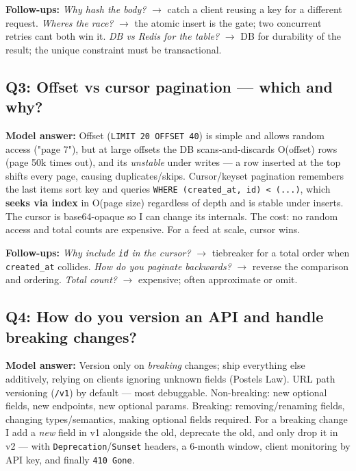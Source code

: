 \documentclass[11pt]{article}
\begin{document}
\textbf{Follow-ups:} \emph{Why hash the body?} \(\rightarrow\) catch a client reusing a key for a different request. \emph{Where\textquotesingle s the race?} \(\rightarrow\) the atomic insert is the gate; two concurrent retries can\textquotesingle t both win it. \emph{DB vs Redis for the table?} \(\rightarrow\) DB for durability of the result; the unique constraint must be transactional.

\subsection{Q3: Offset vs cursor pagination --- which and why?}\label{q3-offset-vs-cursor-pagination--which-and-why}

\textbf{Model answer:} Offset (\texttt{LIMIT\ 20\ OFFSET\ 40}) is simple and allows random access ("page 7"), but at large offsets the DB scans-and-discards O(offset) rows (page 50k times out), and it\textquotesingle s \emph{unstable} under writes --- a row inserted at the top shifts every page, causing duplicates/skips. Cursor/keyset pagination remembers the last item\textquotesingle s sort key and queries \texttt{WHERE\ (created\_at,\ id)\ \textless{}\ (...)}, which \textbf{seeks via index} in O(page size) regardless of depth and is stable under inserts. The cursor is base64-opaque so I can change its internals. The cost: no random access and total counts are expensive. For a feed at scale, cursor wins.

\textbf{Follow-ups:} \emph{Why include \texttt{id} in the cursor?} \(\rightarrow\) tiebreaker for a total order when \texttt{created\_at} collides. \emph{How do you paginate backwards?} \(\rightarrow\) reverse the comparison and ordering. \emph{Total count?} \(\rightarrow\) expensive; often approximate or omit.

\subsection{Q4: How do you version an API and handle breaking changes?}\label{q4-how-do-you-version-an-api-and-handle-breaking-changes}

\textbf{Model answer:} Version only on \emph{breaking} changes; ship everything else additively, relying on clients ignoring unknown fields (Postel\textquotesingle s Law). URL path versioning (\texttt{/v1}) by default --- most debuggable. Non-breaking: new optional fields, new endpoints, new optional params. Breaking: removing/renaming fields, changing types/semantics, making optional fields required. For a breaking change I add a \emph{new} field in v1 alongside the old, deprecate the old, and only drop it in v2 --- with \texttt{Deprecation}/\texttt{Sunset} headers, a 6-month window, client monitoring by API key, and finally \texttt{410\ Gone}.
\end{document}
